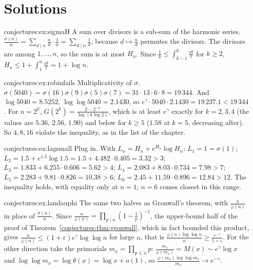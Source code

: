 \section{Solutions}

\begin{solution}{conjectures:ex:sigmaH}
\idea A sum over divisors is a sub-sum of the harmonic series.
\writeup $\frac{\sigma(n)}n=\sum_{d\mid n}\frac nd\cdot\frac1n=\sum_{d\mid n}\frac1d$, because $d\mapsto\frac nd$ permutes the divisors. The divisors are among
$1,\dots,n$, so the sum is at most $H_n$. Since $\frac1k\le\int_{k-1}^k\frac{\dd t}t$ for $k\ge2$, $H_n\le1+\int_1^n\frac{\dd t}t=1+\log n$.
\end{solution}

\begin{solution}{conjectures:ex:robinfails}
\idea Multiplicativity of $\sigma$.
\writeup $\sigma(5040)=\sigma(16)\sigma(9)\sigma(5)\sigma(7)=31\cdot13\cdot6\cdot8=19\,344$. And $\log5040=8.5252$, $\log\log5040=2.1430$, so
$e^\gamma\cdot5040\cdot2.1430=19\,237.1<19\,344$. For $n=2^k$, $G(2^k)=\frac{2-2^{-k}}{\log(k\log2)}$, which is at least $e^\gamma$ exactly for $k=2,3,4$ (the values are
$5.36$, $2.56$, $1.90$) and below for $k\ge5$ ($1.58$ at $k=5$, decreasing after). So $4,8,16$ violate the inequality, as in the list of the chapter.
\end{solution}

\begin{solution}{conjectures:ex:lagsmall}
\idea Plug in.
\writeup With $L_n=H_n+e^{H_n}\log H_n$: $L_1=1=\sigma(1)$; $L_2=1.5+e^{1.5}\log1.5=1.5+4.482\cdot0.405=3.32>3$; $L_3=1.833+6.255\cdot0.606=5.62>4$;
$L_4=2.083+8.03\cdot0.734=7.98>7$; $L_5=2.283+9.81\cdot0.826=10.38>6$; $L_6=2.45+11.59\cdot0.896=12.84>12$. The inequality holds, with equality only at $n=1$; $n=6$
comes closest in this range.
\end{solution}

\begin{solution}{conjectures:ex:landauphi}
\idea The same two halves as Gronwall's theorem, with $\frac n{\varphi(n)}$ in place of $\frac{\sigma(n)}n$.
\writeup Since $\frac n{\varphi(n)}=\prod_{p\mid n}(1-\frac1p)^{-1}$, the upper-bound half of the proof of Theorem~\ref{conjectures:thm:gronwall}, which in fact bounded this product, gives
$\frac n{\varphi(n)}\le(1+\varepsilon)e^\gamma\log\log n$ for large $n$, that is $\frac{\varphi(n)\log\log n}n\ge\frac{e^{-\gamma}}{1+\varepsilon}$. For the other direction take the
primorials $m_x=\prod_{p\le x}p$: $\frac{m_x}{\varphi(m_x)}=M(x)\sim e^\gamma\log x$ and $\log\log m_x=\log\theta(x)=\log x+o(1)$, so
$\frac{\varphi(m_x)\log\log m_x}{m_x}\to e^{-\gamma}$.
\end{solution}


